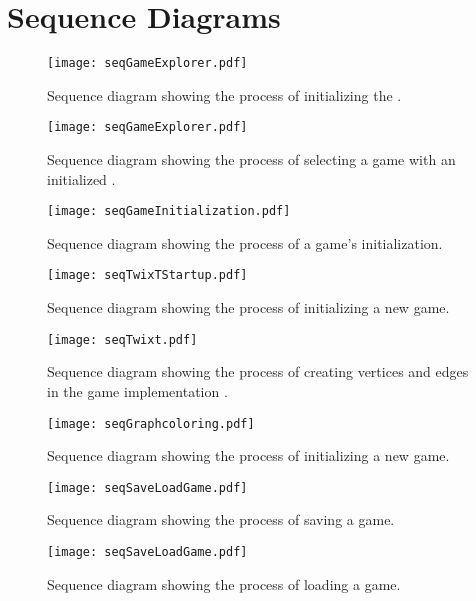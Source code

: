 \section{Sequence Diagrams}


\begin{figure}[h]
	\centering
	\texttt{[image: seqGameExplorer.pdf]}
	\caption{Sequence diagram showing the process of initializing the \gameexplorer.}
	\label{img:seqGameExplorer}
\end{figure}

\begin{figure}[h]
	\centering
	\texttt{[image: seqGameExplorer.pdf]}
	\caption{Sequence diagram showing the process of selecting a game with an initialized \gameexplorer.}
	\label{img:seqGameExplorer}
\end{figure}

\begin{figure}[h]
	\centering
	\texttt{[image: seqGameInitialization.pdf]}
	\caption{Sequence diagram showing the process of a game's initialization.}
	\label{img:seqGameInitialization}
\end{figure}

\begin{figure}[h]
	\centering
	\texttt{[image: seqTwixTStartup.pdf]}
	\caption{Sequence diagram showing the process of initializing a new \twixt game.}
	\label{img:seqTwixTStartup}
\end{figure}

\begin{figure}[h]
	\centering
	\texttt{[image: seqTwixt.pdf]}
	\caption{Sequence diagram showing the process of creating vertices and edges in the game implementation \twixt.}
	\label{img:seqTwixt}
\end{figure}

\begin{figure}[h]
	\centering
	\texttt{[image: seqGraphcoloring.pdf]}
	\caption{Sequence diagram showing the process of initializing a new \graphcoloring game.}
	\label{img:seqGraphcoloring}
\end{figure}

\begin{figure}[h]
	\centering
	\texttt{[image: seqSaveLoadGame.pdf]}
	\caption{Sequence diagram showing the process of saving a game.}
	\label{img:seqSaveLoadGame}
\end{figure}

\begin{figure}[h]
	\centering
	\texttt{[image: seqSaveLoadGame.pdf]}
	\caption{Sequence diagram showing the process of loading a game.}
	\label{img:seqSaveLoadGame}
\end{figure}